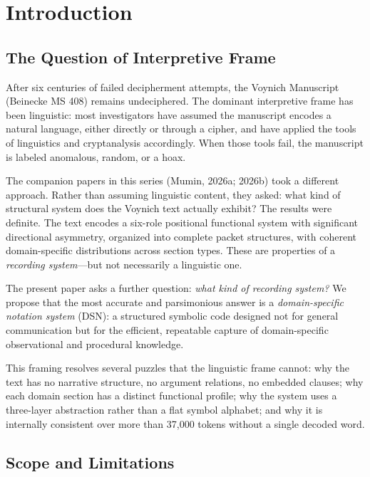 \documentclass[11pt,a4paper,twocolumn]{article}
\begin{document}
\section{Introduction}
\label{sec:intro}

\subsection{The Question of Interpretive Frame}

After six centuries of failed decipherment attempts, the Voynich Manuscript (Beinecke MS 408) remains undeciphered. The dominant interpretive frame has been linguistic: most investigators have assumed the manuscript encodes a natural language, either directly or through a cipher, and have applied the tools of linguistics and cryptanalysis accordingly. When those tools fail, the manuscript is labeled anomalous, random, or a hoax.

The companion papers in this series (Mumin, 2026a; 2026b) took a different approach. Rather than assuming linguistic content, they asked: what kind of structural system does the Voynich text actually exhibit? The results were definite. The text encodes a six-role positional functional system with significant directional asymmetry, organized into complete packet structures, with coherent domain-specific distributions across section types. These are properties of a \textit{recording system}---but not necessarily a linguistic one.

The present paper asks a further question: \textit{what kind of recording system?} We propose that the most accurate and parsimonious answer is a \textit{domain-specific notation system} (DSN): a structured symbolic code designed not for general communication but for the efficient, repeatable capture of domain-specific observational and procedural knowledge.

This framing resolves several puzzles that the linguistic frame cannot: why the text has no narrative structure, no argument relations, no embedded clauses; why each domain section has a distinct functional profile; why the system uses a three-layer abstraction rather than a flat symbol alphabet; and why it is internally consistent over more than 37,000 tokens without a single decoded word.

\subsection{Scope and Limitations}
\end{document}
